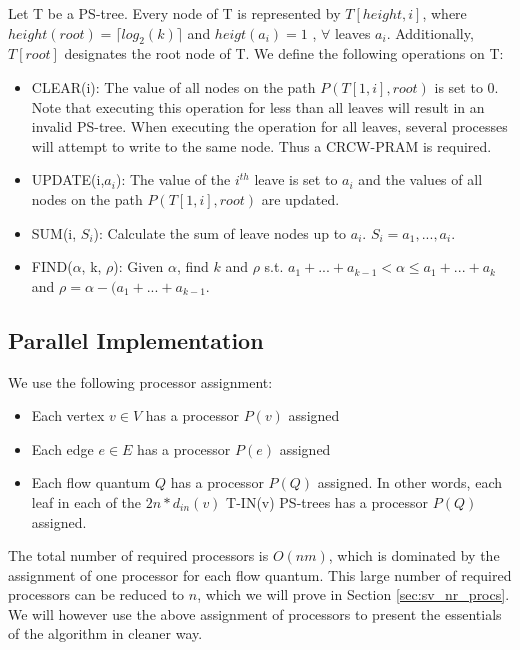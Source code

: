 \documentclass[a4paper,10pt, twocolumn]{article}
\begin{document}
Let T be a PS-tree. Every node of T is represented by $T[height, i]$, where $height(root) = \lceil log_2(k) \rceil$ and $heigt(a_i) = 1$ , $\forall$ leaves $a_i$. Additionally, $T[root]$ designates the root node of T. We define the following operations on T:
\begin{itemize}
	\item CLEAR(i): The value of all nodes on the path $P(T[1,i],root)$ is set to 0. Note that executing this operation for less than all leaves will result in an invalid PS-tree. When executing the operation for all leaves, several processes will attempt to write to the same node. Thus a CRCW-PRAM is required.
	\item UPDATE(i,$a_i$): The value of the $i^{th}$ leave is set to $a_i$ and the values of all nodes on the path $P(T[1,i],root)$ are updated.
	\item SUM(i, $S_i$): Calculate the sum of leave nodes up to $a_i$. $S_i = a_1,...,a_i$.
	\item FIND($\alpha$, k, $\rho$): Given $\alpha$, find $k$ and $\rho$ s.t. $a_1+...+a_{k-1} < \alpha \leq a_1+...+a_k$ and $\rho = \alpha - (a_1+...+a_{k-1}$.
\end{itemize}  

\subsection{Parallel Implementation}
\label{sec:sv_parImpl}
We use the following processor assignment:
\begin{itemize}
	\item Each vertex $v \in V$ has a processor $P(v)$ assigned
	\item Each edge $e \in E$ has a processor $P(e)$ assigned
	\item Each flow quantum $Q$ has a processor $P(Q)$ assigned. In other words, each leaf in each of the $2n * d_{in}(v)$ T-IN(v) PS-trees has a processor $P(Q)$ assigned.
\end{itemize}

The total number of required processors is $O(nm)$, which is dominated by the assignment of one processor for each flow quantum. This large number of required processors can be reduced to $n$, which we will prove in Section \ref{sec:sv_nr_procs}. We will however use the above assignment of processors to present the essentials of the algorithm in cleaner way.   
\end{document}
